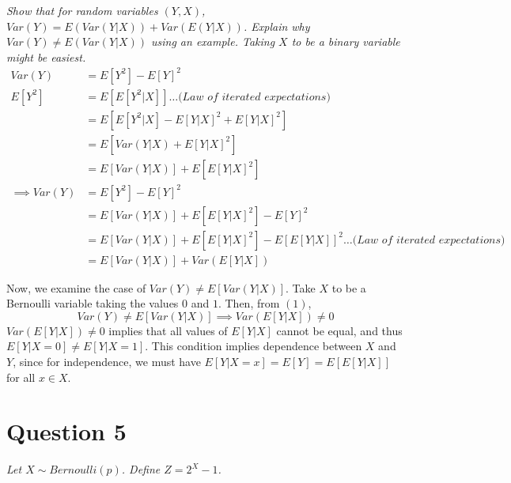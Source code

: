 \documentclass[
]{article}
\begin{document}
\textit{Show that for random variables $(Y,X)$, $Var(Y) = E(Var(Y|X))+Var(E(Y|X))$. Explain why $V ar (Y ) \neq E (V ar (Y |X))$ using an example. Taking $X$ to be a binary variable might be easiest.}
\begin{align*}
Var(Y) &= E[Y^2] - E[Y]^2 \\
E[Y^2] &= E[E[Y^2|X]] \dots \textit{(Law of iterated expectations)} \\
&= E[E[Y^2|X] - E[Y|X]^2 + E[Y|X]^2] \\
&= E[Var(Y|X) + E[Y|X]^2] \\
&= E[Var(Y|X)] + E[E[Y|X]^2] \\
\implies Var(Y) &= E[Y^2] - E[Y]^2 \\
&= E[Var(Y|X)] + E[E[Y|X]^2] - E[Y]^2 \\
&= E[Var(Y|X)] + E[E[Y|X]^2] - E[E[Y|X]]^2 \dots \textit{(Law of iterated expectations)} \\
&= E[Var(Y|X)] + Var(E[Y|X]) \tag{1}
\end{align*}

Now, we examine the case of \(Var(Y) \neq E[Var(Y|X)]\). Take \(X\) to
be a Bernoulli variable taking the values \(0\) and \(1\). Then, from
\((1)\), \[Var(Y) \neq E[Var(Y|X)] \implies Var(E[Y|X]) \neq 0\]
\(Var(E[Y|X]) \neq 0\) implies that all values of \(E[Y|X]\) cannot be
equal, and thus \(E[Y|X=0] \neq E[Y|X=1]\). This condition implies
dependence between \(X\) and \(Y\), since for independence, we must have
\(E[Y|X=x] = E[Y] = E[E[Y|X]]\) for all \(x \in X\).

\hypertarget{question-5}{%
\section{Question 5}\label{question-5}}

\textit{Let $X \sim Bernoulli(p)$. Define $Z = 2^X − 1$.}\\
\end{document}
